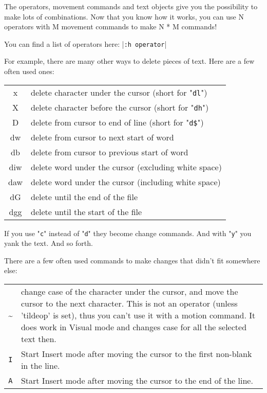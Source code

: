 The operators, movement commands and text objects give you the possibility to make lots of combinations.
Now that you know how it works, you can use N operators with M movement commands to make N * M commands!

You can find a list of operators here: |\verb!:h operator!|

For example, there are many other ways to delete pieces of text.
Here are a few often used ones:

\begin{longtable}{c l}
				x & delete character under the cursor (short for "\verb!dl!") \\
				X & delete character before the cursor (short for "\verb!dh!") \\
				D & delete from cursor to end of line (short for "\verb!d$!") \\
				dw & delete from cursor to next start of word \\
				db & delete from cursor to previous start of word \\
				diw & delete word under the cursor (excluding white space) \\
				daw & delete word under the cursor (including white space) \\
				dG & delete until the end of the file \\
				dgg & delete until the start of the file \\
\end{longtable}

If you use "\verb!c!" instead of "\verb!d!" they become change commands.
And with "\verb!y!" you yank the text.
And so forth.

There are a few often used commands to make changes that didn't fit somewhere else:

\begin{tabularx}{\textwidth}{c X}
				\textasciitilde & 
				change case of the character under the cursor, and move the cursor to the next character.
				This is not an operator (unless 'tildeop' is set), thus you can't use it with a motion command.
				It does work in Visual mode and changes case for all the selected text then. \\

				\texttt{I} &
				Start Insert mode after moving the cursor to the first non-blank in the line.\\

				\texttt{A} & 
				Start Insert mode after moving the cursor to the end of the line.
\end{tabularx}
\clearpage
